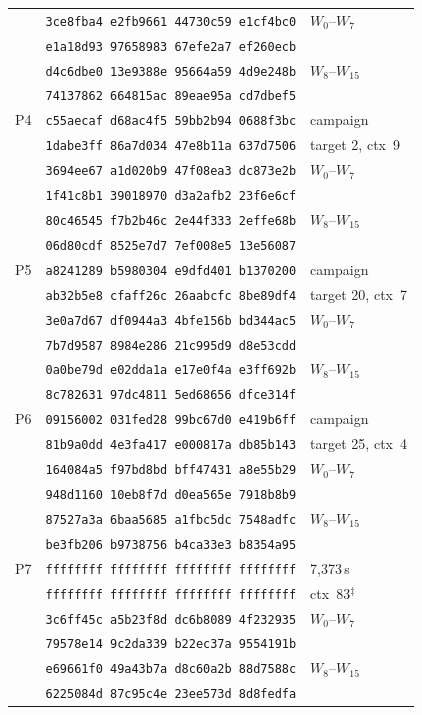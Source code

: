 \documentclass[11pt,a4paper]{article}
\begin{document}
\begin{table}[p]
\begin{tabular}{@{}lll@{}}
   & \texttt{3ce8fba4 e2fb9661 44730c59 e1cf4bc0} & $W_0$--$W_7$ \\
   & \texttt{e1a18d93 97658983 67efe2a7 ef260ecb} & \\
   & \texttt{d4c6dbe0 13e9388e 95664a59 4d9e248b} & $W_8$--$W_{15}$ \\
   & \texttt{74137862 664815ac 89eae95a cd7dbef5} & \\
\midrule
P4 & \texttt{c55aecaf d68ac4f5 59bb2b94 0688f3bc} & campaign \\
   & \texttt{1dabe3ff 86a7d034 47e8b11a 637d7506} & target 2, ctx~9 \\
   & \texttt{3694ee67 a1d020b9 47f08ea3 dc873e2b} & $W_0$--$W_7$ \\
   & \texttt{1f41c8b1 39018970 d3a2afb2 23f6e6cf} & \\
   & \texttt{80c46545 f7b2b46c 2e44f333 2effe68b} & $W_8$--$W_{15}$ \\
   & \texttt{06d80cdf 8525e7d7 7ef008e5 13e56087} & \\
\midrule
P5 & \texttt{a8241289 b5980304 e9dfd401 b1370200} & campaign \\
   & \texttt{ab32b5e8 cfaff26c 26aabcfc 8be89df4} & target 20, ctx~7 \\
   & \texttt{3e0a7d67 df0944a3 4bfe156b bd344ac5} & $W_0$--$W_7$ \\
   & \texttt{7b7d9587 8984e286 21c995d9 d8e53cdd} & \\
   & \texttt{0a0be79d e02dda1a e17e0f4a e3ff692b} & $W_8$--$W_{15}$ \\
   & \texttt{8c782631 97dc4811 5ed68656 dfce314f} & \\
\midrule
P6 & \texttt{09156002 031fed28 99bc67d0 e419b6ff} & campaign \\
   & \texttt{81b9a0dd 4e3fa417 e000817a db85b143} & target 25, ctx~4 \\
   & \texttt{164084a5 f97bd8bd bff47431 a8e55b29} & $W_0$--$W_7$ \\
   & \texttt{948d1160 10eb8f7d d0ea565e 7918b8b9} & \\
   & \texttt{87527a3a 6baa5685 a1fbc5dc 7548adfc} & $W_8$--$W_{15}$ \\
   & \texttt{be3fb206 b9738756 b4ca33e3 b8354a95} & \\
\midrule
P7 & \texttt{ffffffff ffffffff ffffffff ffffffff} & 7{,}373\,s \\
   & \texttt{ffffffff ffffffff ffffffff ffffffff} & ctx~83$^\ddagger$ \\
   & \texttt{3c6ff45c a5b23f8d dc6b8089 4f232935} & $W_0$--$W_7$ \\
   & \texttt{79578e14 9c2da339 b22ec37a 9554191b} & \\
   & \texttt{e69661f0 49a43b7a d8c60a2b 88d7588c} & $W_8$--$W_{15}$ \\
   & \texttt{6225084d 87c95c4e 23ee573d 8d8fedfa} & \\
\bottomrule
\end{tabular}
\end{table}
\end{document}
